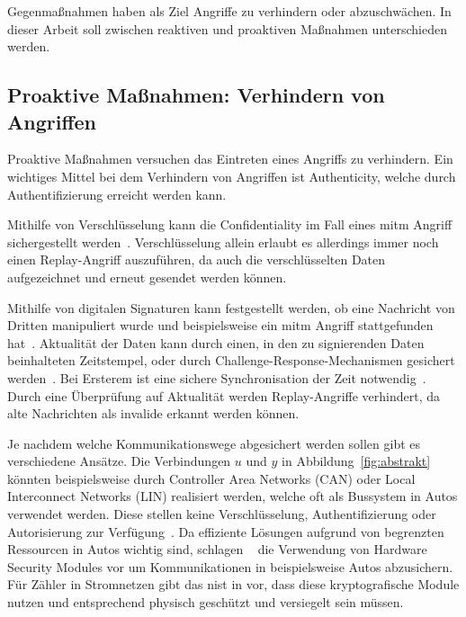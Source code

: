 \documentclass[final,bibliography=totocnumbered]{include/sikseminar}
\begin{document}
    Gegenmaßnahmen haben als Ziel Angriffe zu verhindern oder abzuschwächen.
    In dieser Arbeit soll zwischen reaktiven und proaktiven Maßnahmen unterschieden werden.

    \subsection{Proaktive Maßnahmen: Verhindern von Angriffen}
    \label{subsec:proactive}
    Proaktive Maßnahmen versuchen das Eintreten eines Angriffs zu verhindern.
    Ein wichtiges Mittel bei dem Verhindern von Angriffen ist Authenticity, welche durch Authentifizierung erreicht werden kann.

    Mithilfe von Verschlüsselung kann die Confidentiality im Fall eines \gls{mitm} Angriff sichergestellt werden~\cite{HLL+17}.
    Verschlüsselung allein erlaubt es allerdings immer noch einen Replay-Angriff auszuführen, da auch die verschlüsselten Daten aufgezeichnet und erneut gesendet werden können.

    Mithilfe von digitalen Signaturen kann festgestellt werden, ob eine Nachricht von Dritten manipuliert wurde und beispielsweise ein \gls{mitm} Angriff stattgefunden hat~\cite{CAS08}.
    Aktualität der Daten kann durch einen, in den zu signierenden Daten beinhalteten Zeitstempel, oder durch Challenge-Response-Mechanismen gesichert werden~\cite{CAS08}.
    Bei Ersterem ist eine sichere Synchronisation der Zeit notwendig~\cite{CAS08}.
    Durch eine Überprüfung auf Aktualität werden Replay-Angriffe verhindert, da alte Nachrichten als invalide erkannt werden können.


    Je nachdem welche Kommunikationswege abgesichert werden sollen gibt es verschiedene Ansätze.
    Die Verbindungen $u$ und $y$ in Abbildung~\ref{fig:abstrakt} könnten beispielsweise durch Controller Area Networks (CAN) oder Local Interconnect Networks (LIN) realisiert werden, welche oft als Bussystem in Autos verwendet werden.
    Diese stellen keine Verschlüsselung, Authentifizierung oder Autorisierung zur Verfügung~\cite{HLL+17}.
    Da effiziente Lösungen aufgrund von begrenzten Ressourcen in Autos wichtig sind, schlagen \citeauthor{WG12}~\cite{WG12} die Verwendung von Hardware Security Modules vor um Kommunikationen in beispielsweise Autos abzusichern.
    Für Zähler in Stromnetzen gibt das \gls{nist} in \cite{PB14} vor, dass diese kryptografische Module nutzen und entsprechend physisch geschützt und versiegelt sein müssen.
\end{document}
